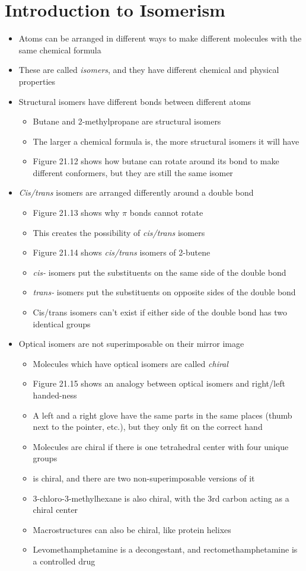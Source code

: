 \documentclass[12pt, openany, letterpaper]{memoir}
\begin{document}
\section{Introduction to Isomerism}
\begin{itemize}
	\item Atoms can be arranged in different ways to make different molecules with the same chemical formula
	\item These are called \emph{isomers}, and they have different chemical and physical properties
	\item Structural isomers have different bonds between different atoms
	\begin{itemize}
		\item Butane and 2-methylpropane are structural isomers
		\item The larger a chemical formula is, the more structural isomers it will have
		\item Figure 21.12 shows how butane can rotate around its bond to make different conformers, but they are still the same isomer
	\end{itemize}
	\item \emph{Cis/trans} isomers are arranged differently around a double bond
	\begin{itemize}
		\item Figure 21.13 shows why $\pi$ bonds cannot rotate
		\item This creates the possibility of \emph{cis/trans} isomers
		\item Figure 21.14 shows \emph{cis/trans} isomers of 2-butene
		\item \emph{cis-} isomers put the substituents on the same side of the double bond
		\item \emph{trans-} isomers put the substituents on opposite sides of the double bond
		\item Cis/trans isomers can't exist if either side of the double bond has two identical groups
	\end{itemize}
	\item Optical isomers are not superimposable on their mirror image
	\begin{itemize}
		\item Molecules which have optical isomers are called \emph{chiral}
		\item Figure 21.15 shows an analogy between optical isomers and right/left handed-ness
		\item A left and a right glove have the same parts in the same places (thumb next to the pointer, etc.), but they only fit on the correct hand
		\item Molecules are chiral if there is one tetrahedral center with four unique groups
		\item {} is chiral, and there are two non-superimposable versions of it
		\item 3-chloro-3-methylhexane is also chiral, with the 3rd carbon acting as a chiral center
		\item Macrostructures can also be chiral, like protein helixes
		\item Levomethamphetamine is a decongestant, and rectomethamphetamine is a controlled drug
	\end{itemize}
\end{itemize}
\end{document}
